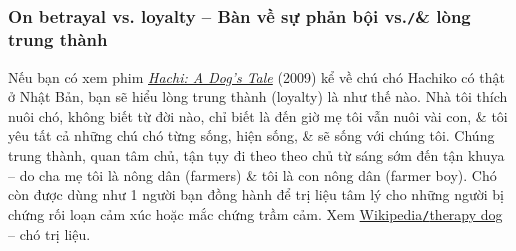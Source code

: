 \documentclass[12pt]{article}
\begin{document}
\subsubsection{On betrayal vs. loyalty -- Bàn về sự phản bội vs.{\tt/}\& lòng trung thành}
Nếu bạn có xem phim \href{https://www.imdb.com/title/tt1028532/}{\it Hachi: A Dog's Tale} (2009) kể về chú chó {\sc Hachiko} có thật ở Nhật Bản, bạn sẽ hiểu lòng trung thành (loyalty) là như thế nào. Nhà tôi thích nuôi chó, không biết từ đời nào, chỉ biết là đến giờ mẹ tôi vẫn nuôi vài con, \& tôi yêu tất cả những chú chó từng sống, hiện sống, \& sẽ sống với chúng tôi. Chúng trung thành, quan tâm chủ, tận tụy đi theo theo chủ từ sáng sớm đến tận khuya -- do cha mẹ tôi là nông dân (farmers) \& tôi là con nông dân (farmer boy). Chó còn được dùng như 1 người bạn đồng hành để trị liệu tâm lý cho những người bị chứng rối loạn cảm xúc hoặc mắc chứng trầm cảm. Xem \href{https://en.wikipedia.org/wiki/Therapy_dog}{Wikipedia{\tt/}therapy dog} -- chó trị liệu.
\end{document}
